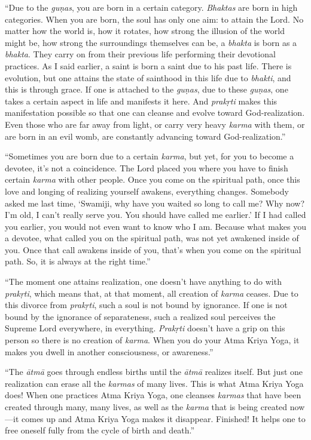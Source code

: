 \enquote{Due to the \textit{guṇas}, you are born in a certain category. \textit{Bhaktas} are born in high categories. When you are born, the soul has only one aim: to attain the Lord. No matter how the world is, how it rotates, how strong the illusion of the world might be, how strong the surroundings themselves can be, a \textit{bhakta} is born as a \textit{bhakta}. They carry on from their previous life performing their devotional practices. As I said earlier, a saint is born a saint due to his past life. There is evolution, but one attains the state of sainthood in this life due to \textit{bhakti}, and this is through grace. If one is attached to the \textit{guṇas}, due to these \textit{guṇas}, one takes a certain aspect in life and manifests it here. And \textit{prakṛti} makes this manifestation possible so that one can cleanse and evolve toward God-realization. Even those who are far away from light, or carry very heavy \textit{karma} with them, or are born in an evil womb, are constantly advancing toward God-realization.}

\enquote{Sometimes you are born due to a certain \textit{karma}, but yet, for you to become a devotee, it’s not a coincidence. The Lord placed you where you have to finish certain \textit{karma} with other people. Once you come on the spiritual path, once this love and longing of realizing yourself awakens, everything changes. Somebody asked me last time, \enquote{Swamiji, why have you waited so long to call me? Why now? I’m old, I can’t really serve you. You should have called me earlier.} If I had called you earlier, you would not even want to know who I am. Because what makes you a devotee, what called you on the spiritual path, was not yet awakened inside of you. Once that call awakens inside of you, that’s when you come on the spiritual path. So, it is always at the right time.}

\enquote{The moment one attains realization, one doesn’t have anything to do with \textit{prakṛti}, which means that, at that moment, all creation of \textit{karma} ceases. Due to this divorce from \textit{prakṛti}, such a soul is not bound by ignorance. If one is not bound by the ignorance of separateness, such a realized soul perceives the Supreme Lord everywhere, in everything. \textit{Prakṛti} doesn’t have a grip on this person so there is no creation of \textit{karma}. When you do your Atma Kriya Yoga, it makes you dwell in another consciousness, or awareness.}

\enquote{The \textit{ātmā} goes through endless births until the \textit{ātmā} realizes itself. But just one realization can erase all the \textit{karmas} of many lives. This is what Atma Kriya Yoga does! When one practices Atma Kriya Yoga, one cleanses \textit{karmas} that have been created through many, many lives, as well as the \textit{karma} that is being created now---it comes up and Atma Kriya Yoga makes it disappear. Finished! It helps one to free oneself fully from the cycle of birth and death.}

